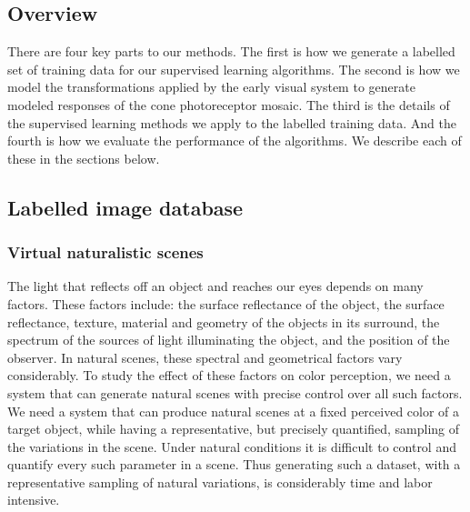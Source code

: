 \documentclass{jov}
\begin{document}
\subsection{Overview}
There are four key parts to our methods.  The first is how we generate a labelled set of training data for our supervised learning algorithms.  The second is how we model the transformations applied by the early visual system to generate modeled responses of the cone photoreceptor mosaic.  The third is the details of the supervised learning methods we apply to the labelled training data.  And the fourth is how we evaluate the performance of the algorithms.  We describe each of these in the sections below.

\subsection{Labelled image database} \label{method:VirtualWorld}

\subsubsection{Virtual naturalistic scenes}
The light that reflects off an object and reaches our eyes depends on many factors. These factors include: the surface reflectance of the object, the surface reflectance, texture, material and geometry of the objects in its surround, the spectrum of the sources of light illuminating the object, and the position of the observer. In natural scenes, these spectral and geometrical factors vary considerably. To study the effect of these factors on color perception, we need a system that can generate natural scenes with precise control over all such factors. We need a system that can produce natural scenes at a fixed perceived color of a target object, while having a representative, but precisely quantified, sampling of the variations in the scene. Under natural conditions it is difficult to control and quantify every such parameter in a scene. Thus generating such a dataset, with a representative sampling of natural variations, is considerably time and labor intensive.
\end{document}
